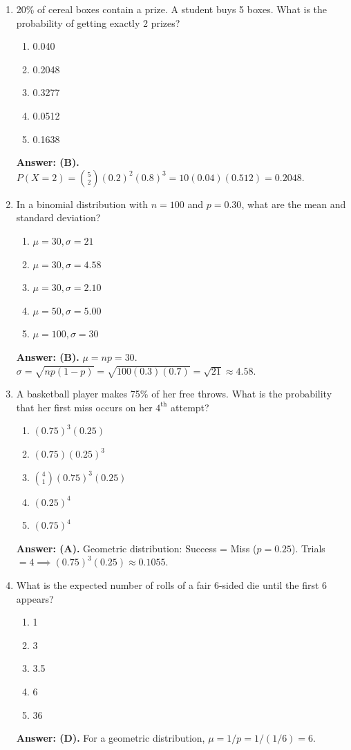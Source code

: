 \begin{enumerate}[leftmargin=1.5em]
  \item 20\% of cereal boxes contain a prize. A student buys 5 boxes. What is the probability of getting exactly 2 prizes?
  \begin{enumerate}[label=(\Alph*)]
    \item 0.040 \item 0.2048 \item 0.3277 \item 0.0512 \item 0.1638
  \end{enumerate}
  \textbf{Answer: (B).} $P(X = 2) = \binom{5}{2} (0.2)^2 (0.8)^3 = 10(0.04)(0.512) = 0.2048$.

  \item In a binomial distribution with $n = 100$ and $p = 0.30$, what are the mean and standard deviation?
  \begin{enumerate}[label=(\Alph*)]
    \item $\mu = 30, \sigma = 21$ \item $\mu = 30, \sigma = 4.58$ \item $\mu = 30, \sigma = 2.10$ \item $\mu = 50, \sigma = 5.00$ \item $\mu = 100, \sigma = 30$
  \end{enumerate}
  \textbf{Answer: (B).} $\mu = np = 30$. $\sigma = \sqrt{np(1-p)} = \sqrt{100(0.3)(0.7)} = \sqrt{21} \approx 4.58$.

  \item A basketball player makes 75\% of her free throws. What is the probability that her first miss occurs on her $4^{\text{th}}$ attempt?
  \begin{enumerate}[label=(\Alph*)]
    \item $(0.75)^3 (0.25)$ \item $(0.75)(0.25)^3$ \item $\binom{4}{1} (0.75)^3 (0.25)$ \item $(0.25)^4$ \item $(0.75)^4$
  \end{enumerate}
  \textbf{Answer: (A).} Geometric distribution: Success = Miss ($p = 0.25$). Trials $= 4 \implies (0.75)^3(0.25) \approx 0.1055$.

  \item What is the expected number of rolls of a fair 6-sided die until the first 6 appears?
  \begin{enumerate}[label=(\Alph*)]
    \item 1 \item 3 \item 3.5 \item 6 \item 36
  \end{enumerate}
  \textbf{Answer: (D).} For a geometric distribution, $\mu = 1/p = 1/(1/6) = 6$.


\end{enumerate}
